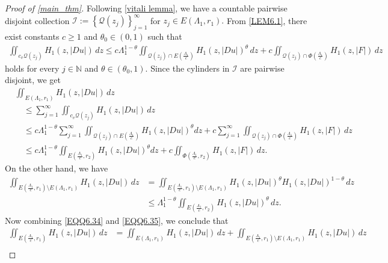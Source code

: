 \documentclass[11pt,oneside, english,reqno,twoside a4paper]{amsart}
\theoremstyle{definition}
\numberwithin{theorem}{section}
\numberwithin{equation}{section}
\newcommand{\NN}{\mathbb{N}}
\begin{document}
\begin{proof}[Proof of \cref{main_thm}]
Following \cref{vitali lemma}, we have a countable pairwise disjoint collection $\mathcal{I}:=\left\{\mathcal{Q}({z_j})\right\}_{j=1}^{\infty}$ for $z_j \in E\left({\Lambda_1, r_1}\right).$ From \cref{LEM6.1}, there exist constants $c \geq 1$ and $\theta_0\in (0,1)$ such that
\begin{align*}
    \iint_{c_v \mathcal{Q}(z_j)} H_1(z, |D u|)\, dz \leq c\Lambda_1^{1-\theta}\iint_{\mathcal{Q}(z_j) \cap E\left({\frac{\Lambda_1}{c}}\right)}H_1(z, |Du|)^{\theta}\, dz+ c\iint_{\mathcal{Q}(z_j)\cap \Phi \left(\frac{\Lambda_1}{c}\right)} H_1(z, |F|)\,dz
\end{align*}
holds for every $j \in \NN$ and $\theta \in (\theta_0, 1).$ Since the cylinders in $\mathcal{I}$ are pairwise disjoint, we get
\begin{align}\label{EQQ6.34}
    & \iint_{E\left({\Lambda_1, r_1}\right)} H_1(z, |D u|)\, dz  \nonumber \\
    &\quad \leq \sum_{j=1}^{\infty} \iint_{c_v \mathcal{Q}(z_j)} H_1(z, |D u|)\, dz\nonumber \\
    &\quad \leq c\Lambda_1^{1-\theta} \sum_{j=1}^{\infty}\iint_{\mathcal{Q}(z_j) \cap E\left({\frac{\Lambda_1}{c}}\right)}H_1(z, |D u|)^{\theta} dz+c\sum_{j=1}^{\infty}\iint_{\mathcal{Q}(z_j)\cap \Phi \left(\frac{\Lambda_1}{c}\right)} H_1(z, |F|)\,dz\nonumber\\
    &\quad \leq c\Lambda_1^{1-\theta}\iint_{E\left({\frac{\Lambda_1}{c}, r_2}\right)}H_1(z, |D u|)^{\theta} dz+ c\iint_{ \Phi \left(\frac{\Lambda_1}{c}, r_2\right)} H_1(z, |F|)\,dz.
\end{align}
On the other hand, we have
\begin{align}\label{EQQ6.35}
    \iint_{E\left({\frac{\Lambda_1}{c}, r_1}\right)\setminus E\left({\Lambda_1, r_1}\right)}H_1(z, |D u|)\, dz
    &= \iint_{E\left({\frac{\Lambda_1}{c}, r_1}\right)\setminus E\left({\Lambda_1, r_1}\right)}H_1(z, |D u|)^\theta H_1(z, |D u|)^{1-\theta}\, dz\nonumber\\
    &\leq \Lambda_1^{1-\theta}\iint_{E\left({\frac{\Lambda_1}{c}}, r_2\right)} H_1(z, |D u|)^{\theta}\,dz.
\end{align}
Now combining \eqref{EQQ6.34} and \eqref{EQQ6.35}, we conclude that 
\begin{align}\label{EQQ6.36}
    \iint_{E\left({\frac{\Lambda_1}{c}, r_1}\right)}H_1(z, |D u|) \, dz&=\iint_{E\left({\Lambda_1, r_1}\right)}H_1(z, |D u|) \, dz+\iint_{E\left({\frac{\Lambda_1}{c}, r_1}\right)\setminus E\left({\Lambda_1, r_1}\right)}H_1(z, |D u|) \, dz\nonumber\\

\end{align}
\end{proof}
\end{document}
